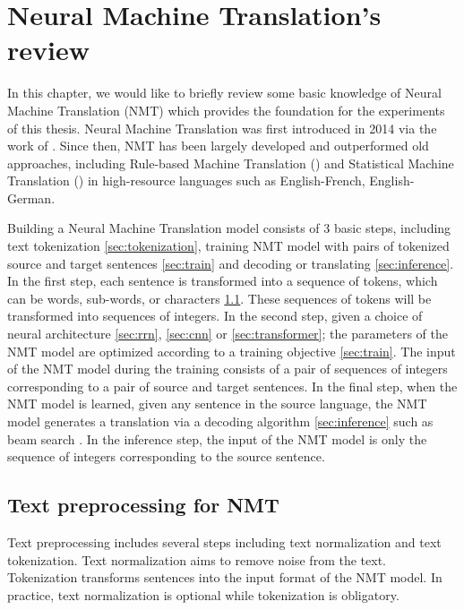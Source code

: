 \chapter{Neural Machine Translation’s review}
In this chapter, we would like to briefly review some basic knowledge of Neural Machine Translation (NMT) which provides the foundation for the experiments of this thesis. Neural Machine Translation was first introduced in 2014 via the work of \citet{Bahdanau15learning,Cho14properties}. Since then, NMT has been largely developed and outperformed old approaches, including Rule-based Machine Translation () and Statistical Machine Translation () in high-resource languages such as English-French, English-German.

Building a Neural Machine Translation model consists of 3 basic steps, including text tokenization \ref{sec:tokenization}, training NMT model with pairs of tokenized source and target sentences \ref{sec:train} and decoding or translating \ref{sec:inference}. In the first step, each sentence is transformed into a sequence of tokens, which can be words, sub-words, or characters \ref{sec:preprocessing}. These sequences of tokens will be transformed into sequences of integers. In the second step, given a choice of neural architecture \ref{sec:rrn}, \ref{sec:cnn} or \ref{sec:transformer}; the parameters of the NMT model are optimized according to a training objective \ref{sec:train}. The input of the NMT model during the training consists of a pair of sequences of integers corresponding to a pair of source and target sentences. In the final step, when the NMT model is learned, given any sentence in the source language, the NMT model generates a translation via a decoding algorithm \ref{sec:inference} such as beam search \citep{Koehn04pharaoh}. In the inference step, the input of the NMT model is only the sequence of integers corresponding to the source sentence.

\section{Text preprocessing for NMT \label{sec:tokenization}} \label{sec:preprocessing}
Text preprocessing includes several steps including text normalization and text tokenization. Text normalization aims to remove noise from the text. Tokenization transforms sentences into the input format of the NMT model. In practice, text normalization is optional while tokenization is obligatory.

